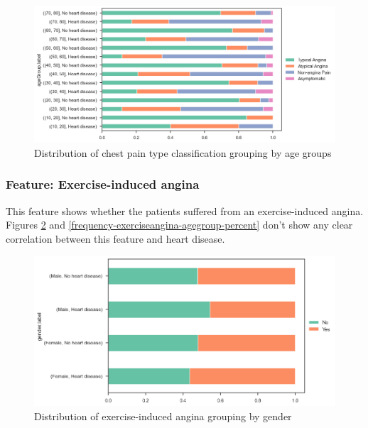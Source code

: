 \begin{figure}
    \caption{Distribution of chest pain type classification grouping by age groups}\label{frequency-paintype-agegroup-percent}
    \centering
    \includegraphics[width=\linewidth]{media/frequency-10-agegroup-paintype.png}
\end{figure}

\subsubsection{Feature: Exercise-induced angina}

This feature shows whether the patients suffered from an exercise-induced angina. Figures \ref{frequency-exerciseangina-gender-percent}
and \ref{frequency-exerciseangina-agegroup-percent} don't show any clear correlation between this feature
and heart disease.

\begin{figure}
    \caption{Distribution of exercise-induced angina grouping by gender}\label{frequency-exerciseangina-gender-percent}
    \centering
    \includegraphics[width=\linewidth]{media/frequency-11-gender-exerciseangina.png}
\end{figure}

